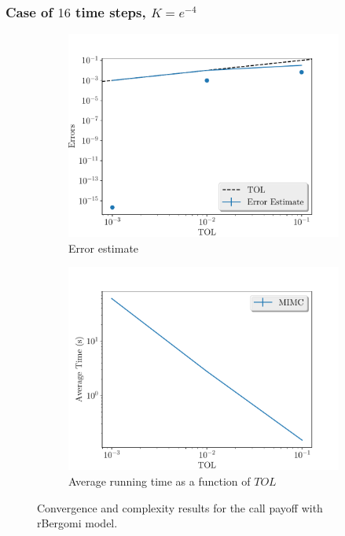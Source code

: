 \documentclass[11pt]{article}
\begin{document}
\newpage
\subsubsection*{Case of $16$ time steps, $K=e^{-4}$}
\begin{figure}[!h]
	\centering
	\begin{subfigure}{.5\textwidth}
		\centering
		\includegraphics[width=1\linewidth]{./figures/rbergomi_16_steps_K_e__4/error_estimate.pdf}
		\caption{Error estimate}
		\label{fig:misc_rbergomi_16_steps_sub1}
	\end{subfigure}%
	\begin{subfigure}{.5\textwidth}
		\centering
		\includegraphics[width=1\linewidth]{./figures/rbergomi_16_steps_K_e__4/average_running_time.pdf}
		\caption{Average running time as a function of $TOL$}
		\label{fig:misc_rbergomi_16_steps_sub2}
	\end{subfigure}%
	\caption{Convergence and complexity results for the call payoff with rBergomi model.}
	\label{fig:misc_rbergomi_16_steps_1}
\end{figure}
\end{document}
